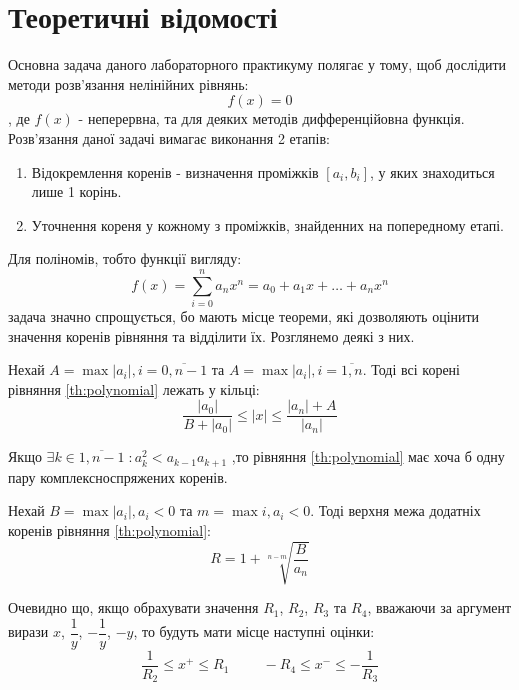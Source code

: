 \section*{\centering Теоретичні відомості}

Основна задача даного лабораторного практикуму полягає у тому,
щоб дослідити методи розв'язання нелінійних рівнянь:
\[
    f(x) = 0
\]
, де $f(x)$ - неперервна, та для деяких методів дифференційовна функція.
Розв'язання даної задачі вимагає виконання 2 етапів:
\begin{enumerate}
    \item Відокремлення коренів - визначення проміжків $[a_i, b_i]$, у
    яких знаходиться лише 1 корінь.
    \item Уточнення кореня у кожному з проміжків, знайденних на попередному етапі.
\end{enumerate}
Для поліномів, тобто функції вигляду:
\begin{equation} \label{th:polynomial}
    f(x) = \sum\limits_{i=0}^n a_n x^n = a_0 + a_1x + \dots + a_nx^n
\end{equation}
задача значно спрощується, бо мають місце теореми, які дозволяють
оцінити значення коренів рівняння та відділити їх. Розглянемо деякі з них.

\begin{theorem} \label{th:bounds}
    Нехай $A = \max |a_i|, i = \overline{0, n-1}$ та
    $A = \max |a_i|, i = \overline{1, n}$.
    Тоді всі корені рівняння \ref{th:polynomial} лежать у кільці:
    \[
        \frac{|a_0|}{B + |a_0|} \leq |x| \leq \frac{|a_n|+A}{|a_n|}
    \]
\end{theorem}

\begin{theorem}[Гюа] \label{th:gua}
    Якщо
    $ \exists k \in \overline{1, n-1} \; : a^2_k < a_{k-1} a_{k+1} $
    ,то рівняння \ref{th:polynomial} має хоча б одну пару комплексноспряжених коренів.
\end{theorem}

\begin{theorem} \label{th:upper_bound}
    Нехай $B = \max |a_i|, a_i < 0$ та
    $m = \max i, a_i < 0 $.
    Тоді верхня межа додатніх коренів рівняння \ref{th:polynomial}:
    \[
        R = 1 + \sqrt[n-m]{\frac{B}{a_n}}
    \]
\end{theorem}

\begin{corollary}
    Очевидно що, якщо обрахувати значення $R_1$, $R_2$, $R_3$ та $R_4$,
    вважаючи за аргумент вирази $x$, $\dfrac{1}{y}$, $-\dfrac{1}{y}$, $-y$, то
    будуть мати місце наступні оцінки:
    \[
        \frac{1}{R_2} \leq x^{+} \leq R_1 \hspace{1cm}
        -R_4 \leq x^{-} \leq -\frac{1}{R_3}
    \]
\end{corollary}

